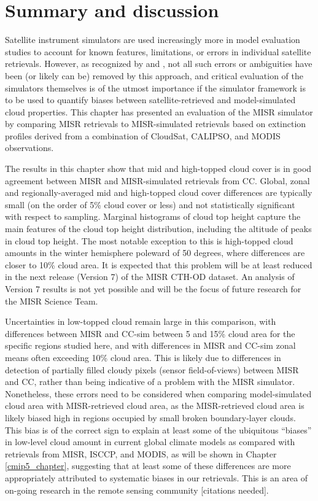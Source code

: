 \section{Summary and discussion}
\label{misr_summary}
Satellite instrument simulators are used increasingly more in model evaluation studies to account for known features, limitations, or errors in individual satellite retrievals. However, as recognized by \cite{pincus_et_al_2012} and \cite{mace_et_al_2011}, not all such errors or ambiguities have been (or likely can be) removed by this approach, and critical evaluation of the simulators themselves is of the utmost importance if the simulator framework is to be used to quantify biases between satellite-retrieved and model-simulated cloud properties. This chapter has presented an evaluation of the MISR simulator by comparing MISR retrievals to MISR-simulated retrievals based on extinction profiles derived from a combination of CloudSat, CALIPSO, and MODIS observations. 

The results in this chapter show that mid and high-topped cloud cover is in good agreement between MISR and MISR-simulated retrievals from CC. Global, zonal and regionally-averaged mid and high-topped cloud cover differences are typically small (on the order of 5\% cloud cover or less) and not statistically significant with respect to sampling. Marginal histograms of cloud top height capture the main features of the cloud top height distribution, including the altitude of peaks in cloud top height.  The most notable exception to this is high-topped cloud amounts in the winter hemisphere poleward of 50 degrees, where differences are closer to 10\% cloud area.  It is expected that this problem will be at least reduced in the next release (Version 7) of the MISR CTH-OD dataset. An analysis of Version 7 results is not yet possible and will be the focus of future research for the MISR Science Team.

Uncertainties in low-topped cloud remain large in this comparison, with differences between MISR and CC-sim between 5 and 15\% cloud area for the specific regions studied here, and with differences in MISR and CC-sim zonal means often exceeding 10\% cloud area. This is likely due to differences in detection of partially filled cloudy pixels (sensor field-of-views) between MISR and CC, rather than being indicative of a problem with the MISR simulator. Nonetheless, these errors need to be considered when comparing model-simulated cloud area with MISR-retrieved cloud area, as the MISR-retrieved cloud area is likely biased high in regions occupied by small broken boundary-layer clouds. This bias is of the correct sign to explain at least some of the ubiquitous ``biases'' in low-level cloud amount in current global climate models as compared with retrievals from MISR, ISCCP, and MODIS, as will be shown in Chapter \ref{cmip5_chapter}, suggesting that at least some of these differences are more appropriately attributed to systematic biases in our retrievals. This is an area of on-going research in the remote sensing community [citations needed].


